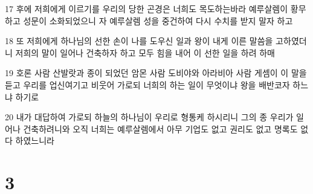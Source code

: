 \par 17 후에 저희에게 이르기를 우리의 당한 곤경은 너희도 목도하는바라 예루살렘이 황무하고 성문이 소화되었으니 자 예루살렘 성을 중건하여 다시 수치를 받지 말자 하고
\par 18 또 저희에게 하나님의 선한 손이 나를 도우신 일과 왕이 내게 이른 말씀을 고하였더니 저희의 말이 일어나 건축하자 하고 모두 힘을 내어 이 선한 일을 하려 하매
\par 19 호론 사람 산발랏과 종이 되었던 암몬 사람 도비야와 아라비아 사람 게셈이 이 말을 듣고 우리를 업신여기고 비웃어 가로되 너희의 하는 일이 무엇이냐 왕을 배반코자 하느냐 하기로
\par 20 내가 대답하여 가로되 하늘의 하나님이 우리로 형통케 하시리니 그의 종 우리가 일어나 건축하려니와 오직 너희는 예루살렘에서 아무 기업도 없고 권리도 없고 명록도 없다 하였느니라

\chapter{3}


